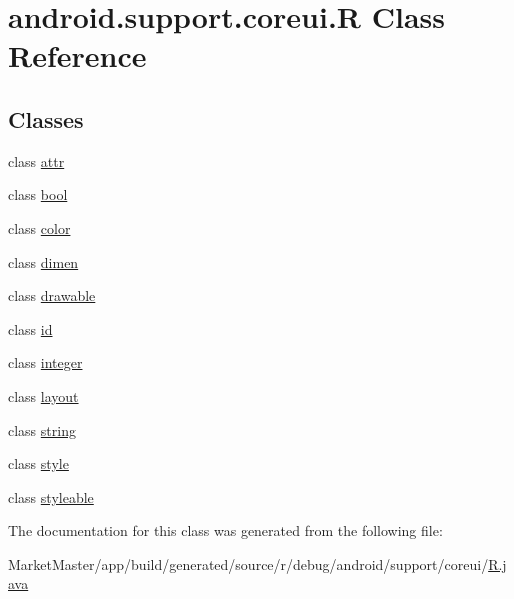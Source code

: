 \hypertarget{classandroid_1_1support_1_1coreui_1_1R}{}\section{android.\+support.\+coreui.\+R Class Reference}
\label{classandroid_1_1support_1_1coreui_1_1R}
\subsection*{Classes}
\begin{DoxyCompactItemize}
\item 
class \mbox{\hyperlink{classandroid_1_1support_1_1coreui_1_1R_1_1attr}{attr}}
\item 
class \mbox{\hyperlink{classandroid_1_1support_1_1coreui_1_1R_1_1bool}{bool}}
\item 
class \mbox{\hyperlink{classandroid_1_1support_1_1coreui_1_1R_1_1color}{color}}
\item 
class \mbox{\hyperlink{classandroid_1_1support_1_1coreui_1_1R_1_1dimen}{dimen}}
\item 
class \mbox{\hyperlink{classandroid_1_1support_1_1coreui_1_1R_1_1drawable}{drawable}}
\item 
class \mbox{\hyperlink{classandroid_1_1support_1_1coreui_1_1R_1_1id}{id}}
\item 
class \mbox{\hyperlink{classandroid_1_1support_1_1coreui_1_1R_1_1integer}{integer}}
\item 
class \mbox{\hyperlink{classandroid_1_1support_1_1coreui_1_1R_1_1layout}{layout}}
\item 
class \mbox{\hyperlink{classandroid_1_1support_1_1coreui_1_1R_1_1string}{string}}
\item 
class \mbox{\hyperlink{classandroid_1_1support_1_1coreui_1_1R_1_1style}{style}}
\item 
class \mbox{\hyperlink{classandroid_1_1support_1_1coreui_1_1R_1_1styleable}{styleable}}
\end{DoxyCompactItemize}


The documentation for this class was generated from the following file\+:\begin{DoxyCompactItemize}
\item 
Market\+Master/app/build/generated/source/r/debug/android/support/coreui/\mbox{\hyperlink{debug_2android_2support_2coreui_2R_8java}{R.\+java}}\end{DoxyCompactItemize}
